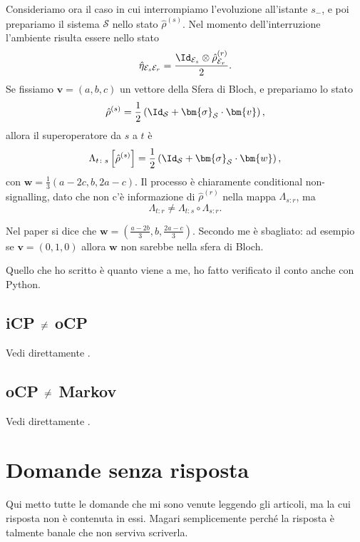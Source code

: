 \documentclass[a4]{article}
\begin{document}
Consideriamo ora il caso in cui interrompiamo l'evoluzione all'istante \(s_-\), e poi
prepariamo il sistema \(\mathcal{S}\) nello stato \(\hat{\rho}^{(s)}\). Nel momento
dell'interruzione l'ambiente risulta essere nello stato
\[\hat{\eta}_{\mathcal{E}_s\mathcal{E}_r} =
      \frac{\Id_{\mathcal{E}_s}\otimes\hat{\rho}^{(r)}_{\mathcal{E}_r}}{2}.\]
Se fissiamo \(\bm{v} = (a,b,c)\) un vettore della Sfera di Bloch, e prepariamo lo
stato 
\[\hat{\rho}^{(s)} =
     \frac{1}{2} \left( \Id_\mathcal{S} + \bm{\sigma}_\mathcal{S} \cdot \bm{v} \right),\]
allora il superoperatore da \(s\) a \(t\) è 
\[\Lambda_{t\colon s} \left[\hat{\rho}^{(s)}\right] =
     \frac{1}{2} \left( \Id_\mathcal{S} + \bm{\sigma}_\mathcal{S} \cdot \bm{w} \right),\]
con \(\bm{w} = \frac{1}{3} (a-2c, b, 2a-c)\). Il processo è chiaramente conditional
non-signalling, dato che non c'è informazione di \(\hat{\rho}^{(r)}\) nella mappa
\(\Lambda_{s\colon r}\), ma 
\[\Lambda_{t\colon r} \not= \Lambda_{t\colon s} \circ \Lambda_{s\colon r}.\]
\begin{tcolorbox}[colback=red!5!white,colframe=red!75!black,title=Attenzione!]
	Nel paper \cite{CPdoesnotimply} si dice che 
	\(\bm{w} = (\frac{a-2b}{3}, b, \frac{2a-c}{3})\). Secondo me è sbagliato: 
	ad esempio se \(\bm{v} = (0,1,0)\) allora \(\bm{w}\) non sarebbe nella
	sfera di Bloch.
	
	Quello che ho scritto è quanto viene a me, ho fatto verificato
	il conto anche con Python.
\end{tcolorbox}

\subsection[iCP non è equivalente a oCP]
           {iCP \(\centernot=\) oCP} \label{cont:icpocp}
Vedi direttamente \cite{CPdoesnotimply}.

\subsection[oCP non è equivalente a Markoviano]
           {oCP \(\centernot=\) Markov} \label{cont:ocpmar}
Vedi direttamente \cite{CPdoesnotimply}.

\section{Domande senza risposta}
Qui metto tutte le domande che mi sono venute leggendo gli articoli, ma la cui risposta
non è contenuta in essi. Magari semplicemente perché la risposta è talmente
banale che non serviva scriverla.
\end{document}
